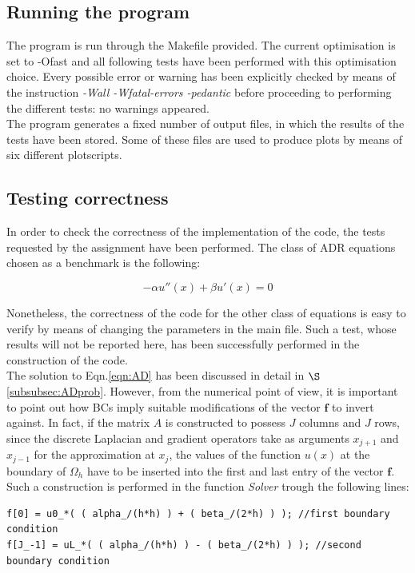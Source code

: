 \documentclass[11pt]{article}
\theoremstyle{theorem}
\theoremstyle{definition}
\begin{document}
\subsection{Running the program}
The program is run through the Makefile provided. The current optimisation is set to -Ofast and all following tests have been performed with this optimisation choice. Every possible error or warning has been explicitly checked by means of the instruction \emph{-Wall -Wfatal-errors -pedantic} before proceeding to performing the different tests: no warnings appeared.\\
The program generates a fixed number of output files, in which the results of the tests have been stored. Some of these files are used to produce plots by means of six different plotscripts.\\ 

\subsection{Testing correctness}
In order to check the correctness of the implementation of the code, the tests requested by the assignment have been performed. The class of ADR equations chosen as a benchmark is the following:

\begin{equation}
	\label{eqn:AD}
	-\alpha u''(x)+\beta u'(x) = 0
\end{equation}

Nonetheless, the correctness of the code for the other class of equations is easy to verify by means of changing the parameters in the main file. Such a test, whose results will not be reported here, has been successfully performed in the construction of the code.\\
The solution to Eqn.\eqref{eqn:AD} has been discussed in detail in $\S$\ref{subsubsec:ADprob}. However, from the numerical point of view, it is important to point out how BCs imply suitable modifications of the vector $\mathbf{f}$ to invert against. In fact, if the matrix $A$ is constructed to possess $J$ columns and $J$ rows, since the discrete Laplacian and gradient operators take as arguments $x_{j+1}$ and $x_{j-1}$ for the approximation at $x_j$, the values of the function $u(x)$ at the boundary of $\Omega_h$ have to be inserted into the first and last entry of the vector $\mathbf{f}$. Such a construction is performed in the function \emph{Solver} trough the following lines:

\begin{lstlisting}
f[0] = u0_*( ( alpha_/(h*h) ) + ( beta_/(2*h) ) ); //first boundary condition
f[J_-1] = uL_*( ( alpha_/(h*h) ) - ( beta_/(2*h) ) ); //second boundary condition
\end{lstlisting}
\end{document}
